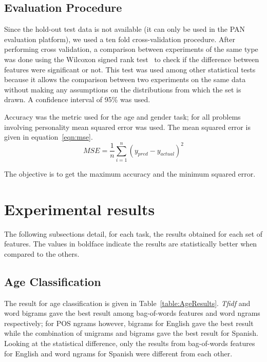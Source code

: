 \documentclass[a4paper]{llncs}
\begin{document}
\subsection{Evaluation Procedure}

Since the hold-out test data is not available (it can only be used in the PAN evaluation platform), we used a ten fold cross-validation procedure. After performing cross validation, a comparison between experiments of the same type was done using the Wilcoxon signed rank test~\cite{wilcoxon1945individual} to check if the difference between features were significant or not. This test was used among  other statistical tests because it allows the comparison between two experiments  on the same data without making any assumptions on the distributions from which the set is drawn. A confidence interval of 95\% was used.

Accuracy was the metric used for the age and gender task; for all problems involving personality mean squared error was used. The mean squared error is given in equation~\ref{eqn:mse}.
\begin{equation}
  MSE =\frac{1}{n} \sum_{i=1}^n \left( y_{pred}-y_{actual}\right)^2 
  \label{eqn:mse}
\end{equation}

The objective is to get the maximum accuracy and the minimum squared error. 



\section{Experimental results}
The following subsections detail, for each task, the results obtained for each set of features. The values in boldface indicate the results are statistically better when compared to the others. 

\subsection{Age Classification}
The result for age classification is given in Table~\ref{table:AgeResults}.
\textit{Tfidf} and word bigrams gave the best result among bag-of-words features and word ngrams respectively; for POS ngrams however, bigrams for English gave the best result while the combination of unigrams and bigrams gave the best result for Spanish. Looking at the statistical difference, only the results from bag-of-words features for English and word ngrams for Spanish were different from each other. 
\end{document}
